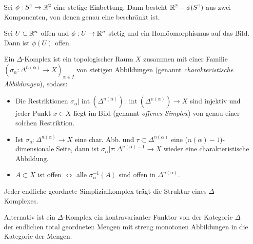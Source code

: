 \documentclass{cheat-sheet}
\newcommand{\inte}{\mathop{\mathrm{int}}} %
\begin{document}
\begin{kor}
  Sei $\phi : S^1 \to \mathbb{R}^2$ eine stetige Einbettung. Dann besteht $\mathbb{R}^2 - \phi(S^1)$ aus zwei Komponenten, von denen genau eine beschränkt ist.
\end{kor}


\begin{satz}
  Sei $U \subset \mathbb{R}^n$ offen und $\phi : U \to \mathbb{R}^n$ stetig und ein Homöomorphismus auf das Bild. Dann ist $\phi(U)$ offen. %
\end{satz}



\begin{defn}
  Ein $\Delta$-Komplex ist ein topologischer Raum $X$ zusammen mit einer Familie $(\sigma_\alpha : \Delta^{n(\alpha)} \to X)_{\alpha \in I}$ von stetigen Abbildungen (genannt \emph{charakteristische Abbildungen}), sodass:
  \begin{itemize}
    \item Die Restriktionen $\sigma_\alpha|\inte(\Delta^{n(\alpha)}) : \inte(\Delta^{n(\alpha)}) \to X$ sind injektiv und jeder Punkt $x \in X$ liegt im Bild (genannt \emph{offenes Simplex}) von genau einer solchen Restriktion.
    \item Ist $\sigma_\alpha : \Delta^{n(\alpha)} \to X$ eine char. Abb. und $\tau \subset \Delta^{n(\alpha)}$ eine ($n(\alpha)-1$)-dimensionale Seite, dann ist $\sigma_\alpha|\tau : \Delta^{n(\alpha)-1} \to X$ wieder eine charakteristische Abbildung.
    \item $A \subset X$ ist offen $\iff$ alle $\sigma_\alpha^{-1}(A)$ sind offen in $\Delta^{n(\alpha)}$.
  \end{itemize}
\end{defn}

\begin{bem}
  Jeder endliche geordnete Simplizialkomplex trägt die Struktur eines $\Delta$-Komplexes.
\end{bem}

\begin{bem}
  Alternativ ist ein $\Delta$-Komplex ein kontravarianter Funktor von der Kategorie $\Delta$ der endlichen total geordneten Mengen mit streng monotonen Abbildungen in die Kategorie der Mengen.
\end{bem}
\end{document}
